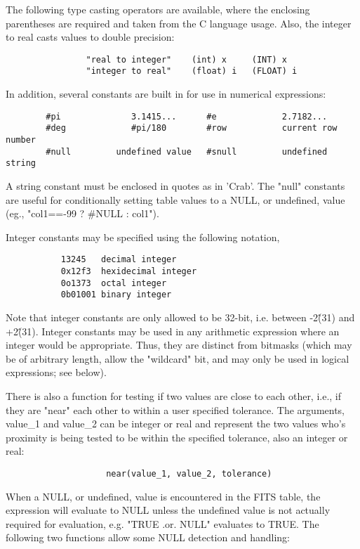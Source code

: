 \documentclass[11pt]{book}
\begin{document}
The following type casting operators are available, where the
enclosing parentheses are required and taken from the C language
usage. Also, the integer to real casts values to double precision:

\begin{verbatim}
                "real to integer"    (int) x     (INT) x
                "integer to real"    (float) i   (FLOAT) i
\end{verbatim}

    In addition, several constants are built in  for  use  in  numerical
    expressions:


\begin{verbatim}
        #pi              3.1415...      #e             2.7182...
        #deg             #pi/180        #row           current row number
        #null         undefined value   #snull         undefined string
\end{verbatim}

    A  string constant must  be enclosed  in quotes  as in  'Crab'.  The
    "null" constants  are useful for conditionally  setting table values
    to a NULL, or undefined, value (eg., "col1==-99 ? \#NULL : col1").

    Integer constants may be specified using the following notation,
\begin{verbatim}
           13245   decimal integer
           0x12f3  hexidecimal integer
           0o1373  octal integer
           0b01001 binary integer
\end{verbatim}
    Note that integer constants are only allowed to be 32-bit, i.e.
    between -2\^(31) and +2\^(31).  Integer constants may be used in any
    arithmetic expression where an integer would be appropriate.  Thus,
    they are distinct from bitmasks (which may be of arbitrary length,
    allow the "wildcard" bit, and may only be used in logical
    expressions; see below).

    There is also a function for testing if  two  values  are  close  to
    each  other,  i.e.,  if  they are "near" each other to within a user
    specified tolerance. The  arguments,  value\_1  and  value\_2  can  be
    integer  or  real  and  represent  the two values who's proximity is
    being tested to be within the specified tolerance, also  an  integer
    or real:

\begin{verbatim}
                    near(value_1, value_2, tolerance)
\end{verbatim}
    When  a  NULL, or undefined, value is encountered in the FITS table,
    the expression will evaluate to NULL unless the undefined  value  is
    not   actually   required  for  evaluation,  e.g. "TRUE  .or.  NULL"
    evaluates to TRUE. The  following  two  functions  allow  some  NULL
    detection  and  handling:
\end{document}
